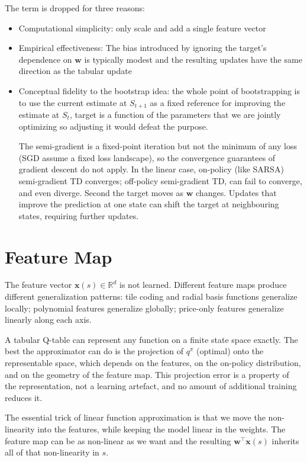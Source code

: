 \documentclass[pdflatex,sn-mathphys-num]{sn-jnl}
\begin{document}
The term is dropped for three reasons:
\begin{itemize}
\item Computational simplicity: only scale and add a single feature vector
\item Empirical effectiveness: The bias introduced by ignoring the target's dependence on $\mathbf{w}$
 is typically modest and the resulting updates have the same direction as the tabular update
\item Conceptual fidelity to the bootstrap idea: the whole point of bootstrapping is to use the current estimate at $S_{t+1}$
 as a fixed reference for improving the estimate at $S_t$, target is a function of the parameters that we are jointly optimizing 
 so adjusting it would defeat the purpose.

The semi-gradient is a fixed-point iteration but not the minimum of any loss (SGD assume a fixed loss landscape), so the convergence guarantees of gradient descent do not apply.
In the linear case, on-policy (like SARSA) semi-gradient TD converges; off-policy semi-gradient TD, can fail to converge, and even diverge.
Second the target moves as $\mathbf{w}$ changes. Updates that improve the prediction at one state can shift the target at neighbouring states, requiring further updates.
\end{itemize}

\section{Feature Map}
\label{sec:featuremap}

The feature vector $\mathbf{x}(s) \in \mathbb{R}^d$ is not learned. Different feature maps produce different generalization patterns:
tile coding and radial basis functions generalize locally; polynomial features generalize globally; price-only features generalize linearly along each axis.

A tabular Q-table can represent any function on a finite state space exactly.
The best the approximator can do is the projection of $q^{\pi}$ (optimal) onto the representable space,
which depends on the features, on the on-policy distribution, and on the geometry of the feature map. 
This projection error is a property of the representation, not a learning artefact, and no amount of additional training reduces it.

The essential trick of linear function approximation is that we move the non-linearity into the features, while keeping the model linear in the weights. 
The feature map  can be as non-linear as we want and the resulting 
$\mathbf{w}^\top \mathbf{x}(s)$ inherits all of that non-linearity in $s$.
\end{document}
